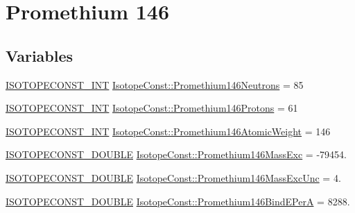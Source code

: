 \hypertarget{group___isotope_const-_promethium-_pm146}{}\section{Promethium 146}
\label{group___isotope_const-_promethium-_pm146}
\subsection*{Variables}
\begin{DoxyCompactItemize}
\item 
\mbox{\hyperlink{group___isotope_const-_macros_ga5f18360b3e99483a35c32d789e62621c}{I\+S\+O\+T\+O\+P\+E\+C\+O\+N\+S\+T\+\_\+\+I\+NT}} \mbox{\hyperlink{group___isotope_const-_promethium-_pm146_gadfbf6395095453b8a0f0511e3bfc8335}{Isotope\+Const\+::\+Promethium146\+Neutrons}} = 85
\item 
\mbox{\hyperlink{group___isotope_const-_macros_ga5f18360b3e99483a35c32d789e62621c}{I\+S\+O\+T\+O\+P\+E\+C\+O\+N\+S\+T\+\_\+\+I\+NT}} \mbox{\hyperlink{group___isotope_const-_promethium-_pm146_gaec84c9e831443e43ad0daf5d9473d9d7}{Isotope\+Const\+::\+Promethium146\+Protons}} = 61
\item 
\mbox{\hyperlink{group___isotope_const-_macros_ga5f18360b3e99483a35c32d789e62621c}{I\+S\+O\+T\+O\+P\+E\+C\+O\+N\+S\+T\+\_\+\+I\+NT}} \mbox{\hyperlink{group___isotope_const-_promethium-_pm146_gab67f8aa59eb9ee3a5e224d91a58c5b6c}{Isotope\+Const\+::\+Promethium146\+Atomic\+Weight}} = 146
\item 
\mbox{\hyperlink{group___isotope_const-_macros_ga8f45a7272ce02c0b4c65c44636ed719a}{I\+S\+O\+T\+O\+P\+E\+C\+O\+N\+S\+T\+\_\+\+D\+O\+U\+B\+LE}} \mbox{\hyperlink{group___isotope_const-_promethium-_pm146_ga20130667413a0a6ec263c42a462120ea}{Isotope\+Const\+::\+Promethium146\+Mass\+Exc}} = -\/79454.
\item 
\mbox{\hyperlink{group___isotope_const-_macros_ga8f45a7272ce02c0b4c65c44636ed719a}{I\+S\+O\+T\+O\+P\+E\+C\+O\+N\+S\+T\+\_\+\+D\+O\+U\+B\+LE}} \mbox{\hyperlink{group___isotope_const-_promethium-_pm146_ga43675682584b013d988e895f6edfb1a1}{Isotope\+Const\+::\+Promethium146\+Mass\+Exc\+Unc}} = 4.
\item 
\mbox{\hyperlink{group___isotope_const-_macros_ga8f45a7272ce02c0b4c65c44636ed719a}{I\+S\+O\+T\+O\+P\+E\+C\+O\+N\+S\+T\+\_\+\+D\+O\+U\+B\+LE}} \mbox{\hyperlink{group___isotope_const-_promethium-_pm146_ga08cfd20cfbd0a0502a2ba6d4208513e9}{Isotope\+Const\+::\+Promethium146\+Bind\+E\+PerA}} = 8288.

\end{DoxyCompactItemize}

